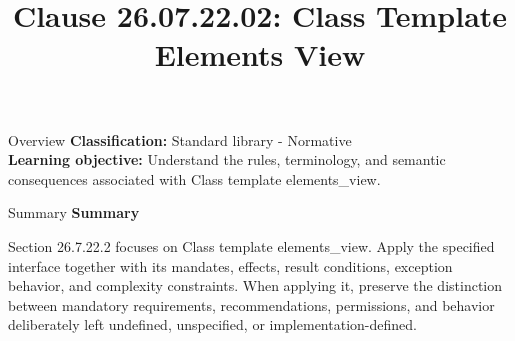 \documentclass[10pt,letterpaper]{article}
\title{Clause 26.07.22.02: Class Template Elements View}
\author{}
\date{}
\begin{document}
\maketitle
\begin{CornellOverviewBox}{Overview}
\textbf{Classification:} Standard library - Normative\\[2pt]
\textbf{Learning objective:} Understand the rules, terminology, and semantic consequences associated with Class template elements\_view.
\end{CornellOverviewBox}\begin{CornellSummaryBox}{Summary}
{\sffamily\bfseries\color{Accent} Summary}\par\vspace{3pt}Section 26.7.22.2 focuses on Class template elements\_view. Apply the specified interface together with its mandates, effects, result conditions, exception behavior, and complexity constraints. When applying it, preserve the distinction between mandatory requirements, recommendations, permissions, and behavior deliberately left undefined, unspecified, or implementation-defined.
\end{CornellSummaryBox}
\end{document}

